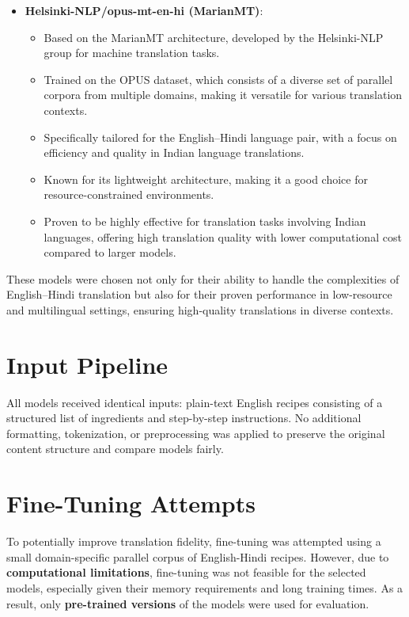 \documentclass[letterpaper,11pt]{report}
\begin{document}
\begin{itemize}
    \item \textbf{Helsinki-NLP/opus-mt-en-hi (MarianMT)}:
    \begin{itemize}
        \item Based on the MarianMT architecture, developed by the Helsinki-NLP group for machine translation tasks.
        \item Trained on the OPUS dataset, which consists of a diverse set of parallel corpora from multiple domains, making it versatile for various translation contexts.
        \item Specifically tailored for the English–Hindi language pair, with a focus on efficiency and quality in Indian language translations.
        \item Known for its lightweight architecture, making it a good choice for resource-constrained environments.
        \item Proven to be highly effective for translation tasks involving Indian languages, offering high translation quality with lower computational cost compared to larger models.
    \end{itemize}
\end{itemize}

These models were chosen not only for their ability to handle the complexities of English–Hindi translation but also for their proven performance in low-resource and multilingual settings, ensuring high-quality translations in diverse contexts.


\section{Input Pipeline}
All models received identical inputs: plain-text English recipes consisting of a structured list of ingredients and step-by-step instructions. No additional formatting, tokenization, or preprocessing was applied to preserve the original content structure and compare models fairly.

\section{Fine-Tuning Attempts}
To potentially improve translation fidelity, fine-tuning was attempted using a small domain-specific parallel corpus of English-Hindi recipes. However, due to \textbf{computational limitations}, fine-tuning was not feasible for the selected models, especially given their memory requirements and long training times. As a result, only \textbf{pre-trained versions} of the models were used for evaluation.
\end{document}
